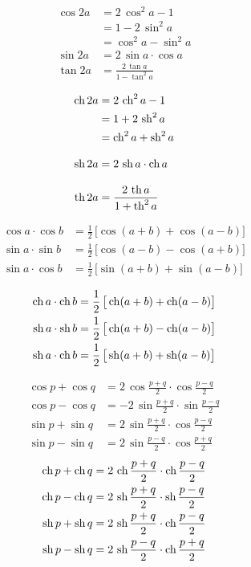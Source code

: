 \documentclass[10pt,class=article,crop=false]{standalone}
\begin{document}
\begin{multicols}{2}
	\begin{align*}
		\cos 2a &= 2\,\cos^2a-1\\
		&= 1-2\,\sin^2a\\
		&=\cos^2a-\sin^2a\\[3mm]
		\sin 2a &= 2\,\sin a\cdot\cos a\\[3mm]
		\tan 2a &= \frac{2\,\tan a}{1-\tan^2 a}
	\end{align*}
	
	\begin{align*}
		\operatorname{ch} 2a &= 2\,\operatorname{ch}^2a-1\\
		&= 1+2\,\operatorname{sh}^2a\\
		&=\operatorname{ch}^2a+\operatorname{sh}^2a\\[3mm]
		\operatorname{sh} 2a &= 2\,\operatorname{sh} a\cdot\operatorname{ch} a\\[3mm]
		\operatorname{th} 2a &= \frac{2\,\operatorname{th} a}{1+\operatorname{th}^2 a}
	\end{align*}
\end{multicols}


\begin{multicols}{2}
	\small
	\begin{align*}
		\cos a\cdot\cos b &= \frac{1}{2}\,\big[ \cos(a+b)+\cos(a-b)\big]\\
		\sin a\cdot\sin b &= \frac{1}{2}\,\big[ \cos(a-b)-\cos(a+b)\big]\\
		\sin a\cdot\cos b &= \frac{1}{2}\,\big[ \sin(a+b)+\sin(a-b)\big]
	\end{align*}
	
	\begin{align*}
		\operatorname{ch} a\cdot\operatorname{ch} b &= \frac{1}{2}\,\big[ \operatorname{ch}(a+b)+\operatorname{ch}(a-b)\big]\\
		\operatorname{sh} a\cdot\operatorname{sh} b &= \frac{1}{2}\,\big[ \operatorname{ch}(a+b)-\operatorname{ch}(a-b)\big]\\
		\operatorname{sh} a\cdot\operatorname{ch} b &= \frac{1}{2}\,\big[ \operatorname{sh}(a+b)+\operatorname{sh}(a-b)\big]
	\end{align*}
\end{multicols}



\begin{multicols}{2}
	\begin{align*}
		\cos p+\cos q &= 2\,\cos \frac{p+q}{2}\cdot\cos\frac{p-q}{2}\\
		\cos p-\cos q &= -2\,\sin \frac{p+q}{2}\cdot\sin \frac{p-q}{2}\\
		\sin p+\sin q &= 2\,\sin \frac{p+q}{2}\cdot\cos\frac{p-q}{2}\\
		\sin p-\sin q &= 2\,\sin \frac{p-q}{2}\cdot\cos\frac{p+q}{2}
	\end{align*}\vspace{0.1cm}
	\begin{align*}
		\operatorname{ch} p+\operatorname{ch} q &= 2\,\operatorname{ch} \frac{p+q}{2}\cdot\operatorname{ch}\frac{p-q}{2}\\
		\operatorname{ch} p-\operatorname{ch} q &= 2\,\operatorname{sh} \frac{p+q}{2}\cdot\operatorname{sh} \frac{p-q}{2}\\
		\operatorname{sh} p+\operatorname{sh} q &= 2\,\operatorname{sh} \frac{p+q}{2}\cdot\operatorname{ch}\frac{p-q}{2}\\
		\operatorname{sh} p-\operatorname{sh} q &= 2\,\operatorname{sh} \frac{p-q}{2}\cdot\operatorname{ch}\frac{p+q}{2}
	\end{align*}
\end{multicols}
\end{document}
